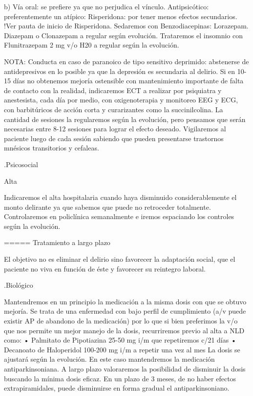 b) Vía oral: se prefiere ya que no perjudica el vínculo. Antipsicótico: preferentemente un atípico: Risperidona: por tener menos efectos secundarios. !Ver pauta de inicio de Risperidona. Sedaremos con Benzodiacepinas: Lorazepam. Diazepam o Clonazepam a regular según evolución. Trataremos el insomnio con Flunitrazepam 2 mg v/o H20 a regular según la evolución.

NOTA: Conducta en caso de paranoico de tipo sensitivo deprimido: abstenerse de antidepresivos en lo posible ya que la depresión es secundaria al delirio. Si en 10-15 días no obtenemos mejoría ostensible con mantenimiento importante de falta de contacto con la realidad, indicaremos ECT a realizar por psiquiatra y anestesista, cada día por medio, con oxigenoterapia y monitoreo EEG y ECG, con barbitúricos de acción corta y curarizantes como la succinilcolina. La cantidad de sesiones la regularemos según la evolución, pero pensamos que serán necesarias entre 8-12 sesiones para lograr el efecto deseado. Vigilaremos al paciente luego de cada sesión sabiendo que pueden presentarse trastornos mnésicos transitorios y cefaleas.

.Psicosocial


Alta

Indicaremos el alta hospitalaria cuando haya disminuido considerablemente el monto delirante ya que sabemos que puede no retroceder totalmente. Controlaremos en policlínica semanalmente e iremos espaciando los controles según la evolución.

===== Tratamiento a largo plazo

El objetivo no es eliminar el delirio sino favorecer la adaptación social, que el paciente no viva en función de éste y favorecer su reintegro laboral.

.Biológico

Mantendremos en un principio la medicación a la misma dosis con que se obtuvo mejoría. Se trata de una enfermedad con bajo perfil de cumplimiento (a/v puede existir AP de abandono de la medicación) por lo que si bien preferimos la v/o que nos permite un mejor manejo de la dosis, recurriremos previo al alta a NLD como: • Palmitato de Pipotiazina 25-50 mg i/m que repetiremos c/21 días • Decanoato de Haloperidol 100-200 mg i/m a repetir una vez al mes La dosis se ajustará según la evolución. En este caso mantendremos la medicación antiparkinsoniana. A largo plazo valoraremos la posibilidad de disminuir la dosis buscando la mínima dosis eficaz. En un plazo de 3 meses, de no haber efectos extrapiramidales, puede disminuirse en forma gradual el antiparkinsoniano.

